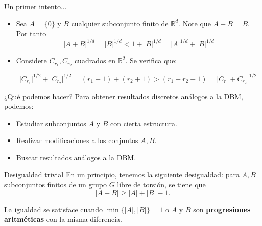 \documentclass{beamer}
\begin{document}
\begin{frame}{Un primer intento...}

\begin{itemize}[<+->]
    \item Sea $A = \{0\}$ y $B$ cualquier subconjunto finito de $\mathbb R^d$. Note que $A + B = B$. Por tanto  $$ \lvert A + B \rvert^{1/d} = \lvert B \rvert^{1/d} < 1 + \lvert B \rvert^{1/d} = \lvert A \rvert^{1/d} + \lvert B \rvert^{1/d}$$

    \item  Considere $C_{r_1}, C_{r_2}$ cuadrados en $\mathbb R^2.$ Se verifica que:

    $$\lvert C_{r_1} \rvert^{1/2} + \lvert C_{r_2}\rvert^{1/2} = (r_1+1) + (r_2 + 1) > (r_1 + r_2 + 1) = \lvert C_{r_1} + C_{r_2} \rvert^{1/2.} $$

\end{itemize}
\end{frame}

\begin{frame}{¿Qué podemos hacer?}
Para obtener resultados discretos análogos a la DBM, podemos:
\begin{itemize}[<+->]
    \item Estudiar subconjuntos $A$ y $B$ con cierta estructura.
    \item Realizar modificaciones a los conjuntos $A,B.$
    \item Buscar resultados análogos a la DBM.

\end{itemize}
    
\end{frame}

    


\begin{frame}{Desigualdad trivial}
    En un principio, tenemos la siguiente desigualdad: para $A, B$ subconjuntos finitos de un grupo $G$ libre de torsión, se tiene que 
    $$\lvert A + B\rvert \geq \lvert A \rvert + \lvert B \rvert -1.$$

    La igualdad se satisface cuando $\min \{\lvert A \rvert, \lvert B \rvert\} = 1$ o $A$ y $B$ son \textbf{progresiones aritméticas} con la misma diferencia.

\end{frame}
\end{document}
